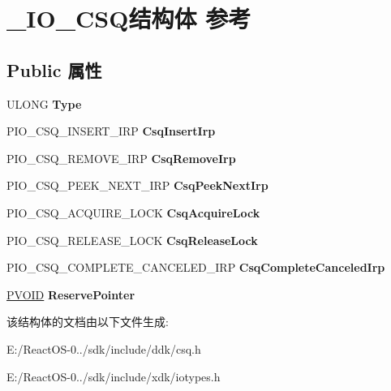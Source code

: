 \hypertarget{struct___i_o___c_s_q}{}\section{\+\_\+\+I\+O\+\_\+\+C\+S\+Q结构体 参考}
\label{struct___i_o___c_s_q}
\subsection*{Public 属性}
\begin{DoxyCompactItemize}
\item 
\mbox{\label{struct___i_o___c_s_q_a94b502477eb51fac261f83d5311d397c}} 
U\+L\+O\+NG {\bfseries Type}
\item 
\mbox{\label{struct___i_o___c_s_q_af2822285e35dab911fcefa52b16c3c66}} 
P\+I\+O\+\_\+\+C\+S\+Q\+\_\+\+I\+N\+S\+E\+R\+T\+\_\+\+I\+RP {\bfseries Csq\+Insert\+Irp}
\item 
\mbox{\label{struct___i_o___c_s_q_a6917e198aae9c92c84cb3d3abb6e0531}} 
P\+I\+O\+\_\+\+C\+S\+Q\+\_\+\+R\+E\+M\+O\+V\+E\+\_\+\+I\+RP {\bfseries Csq\+Remove\+Irp}
\item 
\mbox{\label{struct___i_o___c_s_q_aebfb262d727b103e3ae476084232272e}} 
P\+I\+O\+\_\+\+C\+S\+Q\+\_\+\+P\+E\+E\+K\+\_\+\+N\+E\+X\+T\+\_\+\+I\+RP {\bfseries Csq\+Peek\+Next\+Irp}
\item 
\mbox{\label{struct___i_o___c_s_q_a33d1ee02088462a266743ca52952ed70}} 
P\+I\+O\+\_\+\+C\+S\+Q\+\_\+\+A\+C\+Q\+U\+I\+R\+E\+\_\+\+L\+O\+CK {\bfseries Csq\+Acquire\+Lock}
\item 
\mbox{\label{struct___i_o___c_s_q_a26d60e3aaf89e0e095b61cbb90f55ef4}} 
P\+I\+O\+\_\+\+C\+S\+Q\+\_\+\+R\+E\+L\+E\+A\+S\+E\+\_\+\+L\+O\+CK {\bfseries Csq\+Release\+Lock}
\item 
\mbox{\label{struct___i_o___c_s_q_a5c233dcd157410ef3e308a92e3999ae2}} 
P\+I\+O\+\_\+\+C\+S\+Q\+\_\+\+C\+O\+M\+P\+L\+E\+T\+E\+\_\+\+C\+A\+N\+C\+E\+L\+E\+D\+\_\+\+I\+RP {\bfseries Csq\+Complete\+Canceled\+Irp}
\item 
\mbox{\label{struct___i_o___c_s_q_a5590dfd784bcff24007b719b27ab0f70}} 
\hyperlink{interfacevoid}{P\+V\+O\+ID} {\bfseries Reserve\+Pointer}
\end{DoxyCompactItemize}


该结构体的文档由以下文件生成\+:\begin{DoxyCompactItemize}
\item 
E\+:/\+React\+O\+S-\/0../sdk/include/ddk/csq.\+h\item 
E\+:/\+React\+O\+S-\/0../sdk/include/xdk/iotypes.\+h\end{DoxyCompactItemize}
